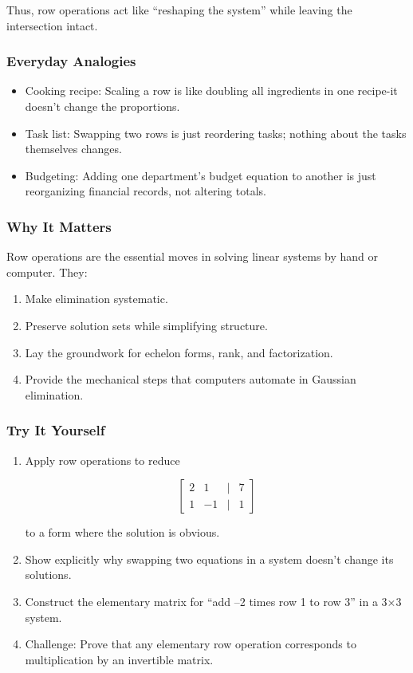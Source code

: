 \documentclass[
  letterpaper,
  DIV=11,
  numbers=noendperiod]{scrreprt}
\providecommand{\tightlist}{%
  \setlength{\itemsep}{0pt}\setlength{\parskip}{0pt}}
\begin{document}
Thus, row operations act like ``reshaping the system'' while leaving the
intersection intact.

\subsubsection{Everyday Analogies}\label{everyday-analogies-18}

\begin{itemize}
\tightlist
\item
  Cooking recipe: Scaling a row is like doubling all ingredients in one
  recipe-it doesn't change the proportions.
\item
  Task list: Swapping two rows is just reordering tasks; nothing about
  the tasks themselves changes.
\item
  Budgeting: Adding one department's budget equation to another is just
  reorganizing financial records, not altering totals.
\end{itemize}

\subsubsection{Why It Matters}\label{why-it-matters-18}

Row operations are the essential moves in solving linear systems by hand
or computer. They:

\begin{enumerate}
\def\labelenumi{\arabic{enumi}.}
\tightlist
\item
  Make elimination systematic.
\item
  Preserve solution sets while simplifying structure.
\item
  Lay the groundwork for echelon forms, rank, and factorization.
\item
  Provide the mechanical steps that computers automate in Gaussian
  elimination.
\end{enumerate}

\subsubsection{Try It Yourself}\label{try-it-yourself-21}

\begin{enumerate}
\def\labelenumi{\arabic{enumi}.}
\item
  Apply row operations to reduce

  \[
  \begin{bmatrix}  
  2 & 1 & | & 7 \\  
  1 & -1 & | & 1  
  \end{bmatrix}
  \]

  to a form where the solution is obvious.
\item
  Show explicitly why swapping two equations in a system doesn't change
  its solutions.
\item
  Construct the elementary matrix for ``add --2 times row 1 to row 3''
  in a 3×3 system.
\item
  Challenge: Prove that any elementary row operation corresponds to
  multiplication by an invertible matrix.
\end{enumerate}
\end{document}

